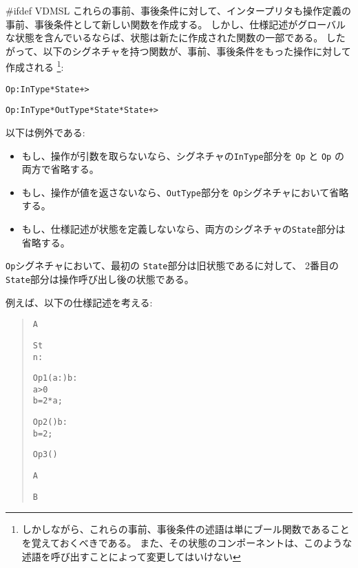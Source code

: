 \documentclass[\pformat,12pt]{jarticle}
\begin{document}
\begin{description}
#ifdef VDMSL
これらの事前、事後条件に対して、インタープリタも操作定義の事前、事後条件として新しい関数を作成する。
しかし、仕様記述がグローバルな状態を含んでいるならば、状態は新たに作成された関数の一部である。 
したがって、以下のシグネチャを持つ関数が、事前、事後条件をもった操作に対して作成される
\footnote{しかしながら、これらの事前、事後条件の述語は単にブール関数であることを覚えておくべきである。
また、その状態のコンポーネントは、このような述語を呼び出すことによって変更してはいけない}:
\begin{alltt}
  Op : InType * State +> 

  Op : InType * OutType * State * State +> 
\end{alltt}
以下は例外である:
\begin{itemize}
\item もし、操作が引数を取らないなら、シグネチャの{\tt InType}部分を {\tt {}Op} と {\tt {}Op}
の両方で省略する。

\item もし、操作が値を返さないなら、{\tt OutType}部分を {\tt {}Op}シグネチャにおいて省略する。

\item もし、仕様記述が状態を定義しないなら、両方のシグネチャの{\tt State}部分は省略する。

\end{itemize}

{\tt {}Op}シグネチャにおいて、最初の {\tt State}部分は旧状態であるに対して、
2番目の {\tt State}部分は操作呼び出し後の状態である。

例えば、以下の仕様記述を考える:

\begin{quotation}
\begin{minipage}[t]{.4\textwidth}
\begin{alltt}
 A


 St 
  n : 


Op1 (a : ) b :
 a > 0
 b = 2 * a;

Op2 () b : 
 b = 2;

Op3 ()
 

 A

\end{alltt}
\end{minipage}
\begin{minipage}[t]{.4\textwidth}
\begin{alltt}
 B


\end{alltt}
\end{minipage}
\end{quotation}
\end{description}
\end{document}

